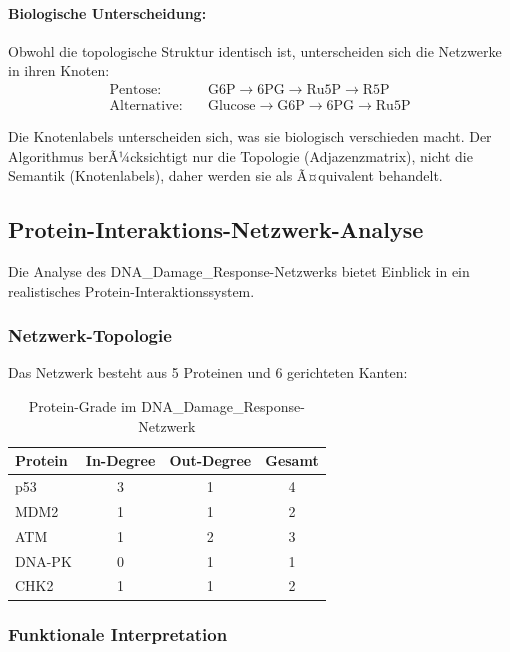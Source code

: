 ﻿\documentclass[a4paper,12pt]{article}
\theoremstyle{definition}
\begin{document}
\paragraph{Biologische Unterscheidung:}
Obwohl die topologische Struktur identisch ist, unterscheiden sich die Netzwerke in ihren Knoten:
\begin{align*}
	\text{Pentose}: &\quad \text{G6P} \rightarrow \text{6PG} \rightarrow \text{Ru5P} \rightarrow \text{R5P} \\
	\text{Alternative}: &\quad \text{Glucose} \rightarrow \text{G6P} \rightarrow \text{6PG} \rightarrow \text{Ru5P}
\end{align*}

Die Knotenlabels unterscheiden sich, was sie biologisch verschieden macht. Der Algorithmus berÃ¼cksichtigt nur die Topologie (Adjazenzmatrix), nicht die Semantik (Knotenlabels), daher werden sie als Ã¤quivalent behandelt.

\subsection{Protein-Interaktions-Netzwerk-Analyse}

Die Analyse des DNA\_Damage\_Response-Netzwerks bietet Einblick in ein realistisches Protein-Interaktionssystem.

\subsubsection{Netzwerk-Topologie}

Das Netzwerk besteht aus 5 Proteinen und 6 gerichteten Kanten:

\begin{table}[h]
	\centering
	\caption{Protein-Grade im DNA\_Damage\_Response-Netzwerk}
	\label{tab:protein_degrees}
	\begin{tabular}{|l|c|c|c|}
		\hline
		\textbf{Protein} & \textbf{In-Degree} & \textbf{Out-Degree} & \textbf{Gesamt} \\
		\hline
		p53 & 3 & 1 & 4 \\
		MDM2 & 1 & 1 & 2 \\
		ATM & 1 & 2 & 3 \\
		DNA-PK & 0 & 1 & 1 \\
		CHK2 & 1 & 1 & 2 \\
		\hline
	\end{tabular}
\end{table}

\subsubsection{Funktionale Interpretation}
\end{document}
